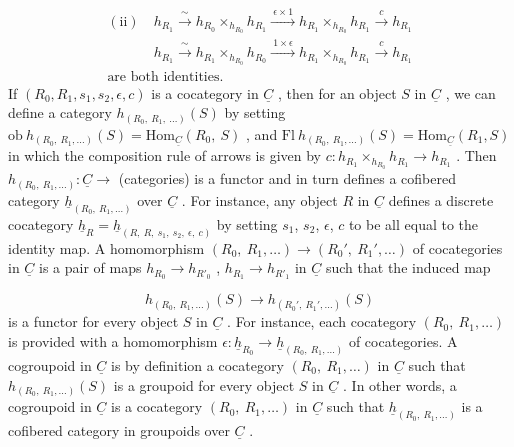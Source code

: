 \begin{multline*}
(\mathrm{ii}) \quad h_{R_1} \xrightarrow{\ \sim\ } h_{R_0} \times_{h_{R_0}} h_{R_1} \xrightarrow{\ \epsilon \times 1\ } h_{R_1} \times_{h_{R_0}} h_{R_1} \xrightarrow{\ c\ } h_{R_1}
\\[2ex]
\phantom{(\mathrm{ii})} \quad h_{R_1} \xrightarrow{\ \sim\ } h_{R_1} \times_{h_{R_0}} h_{R_0} \xrightarrow{\ 1 \times \epsilon\ } h_{R_1} \times_{h_{R_0}} h_{R_1} \xrightarrow{\ c\ } h_{R_1}
\\[1ex]
\text{are both identities.}
\end{multline*}
If  $(R_0, R_1, s_1, s_2, \epsilon, c)$  is a cocategory in $\underline{C}$ , then for an object $S$ in $\underline{C}$ , we can define a category  $h_{(R_0,\ R_1,\ \ldots)}(S)$  by setting  $\mathrm{ob}\ h_{(R_0,\ R_1,\ldots)}(S) = \mathrm{Hom}_{\underline{C}}(R_0,\ S)$ , and  $\mathrm{Fl}\ h_{(R_0,\ R_1,\ldots)}(S) = \mathrm{Hom}_{\underline{C}}(R_1,S)$  in which the composition rule of arrows is given by  $c : h_{R_1} \times_{h_{R_0}} h_{R_1} \to h_{R_1}$ . Then $h_{(R_0,\ R_1,\ldots)} : \underline{C} \to$ (categories)  is a functor and in turn defines a cofibered category $\underline{h}_{(R_0,\ R_1,\ldots)}$ over $\underline{C}$ . For instance, any object $R$ in $\underline{C}$ defines a discrete cocategory $\underline{h}_R = \underline{h}_{(R,\ R,\ s_1,\ s_2,\ \epsilon,\ c)}$ by setting $s_1$, $s_2$, $\epsilon$, $c$ to be all equal to the identity map. A homomorphism  $(R_0,\ R_1,\ldots) \to (R_0{}',\ R_1{}',\ldots)$
of cocategories in $\underline{C}$ is a pair of maps $h_{R_0} \to h_{R'_0}$ , $h_{R_1} \to h_{R'_1}$ in $\underline{C}$ such that the induced map

\begin{equation*}
h_{(R_0,\ R_1,\ldots)}(S) \to h_{(R_0',\ R_1',\ldots)}(S)
\end{equation*}
is a functor for every object $S$ in $\underline{C}$ . For instance, each cocategory $(R_0,\ R_1,\ldots)$ is provided with a homomorphism $\epsilon : \underline{h}_{R_0} \to \underline{h}_{(R_0,\ R_1,\ldots)}$ of cocategories. A cogroupoid in $\underline{C}$ is by definition a cocategory $(R_0,\ R_1,\ldots)$ in $\underline{C}$ such that $h_{(R_0,\ R_1,\ldots)}(S)$ is a groupoid for every object $S$ in $\underline{C}$ . In other words, a cogroupoid in $\underline{C}$ is a cocategory $(R_0,\ R_1,\ldots)$ in $\underline{C}$ such that $\underline{h}_{(R_0,\ R_1,\ldots)}$ is a cofibered category in groupoids over $\underline{C}$ .

